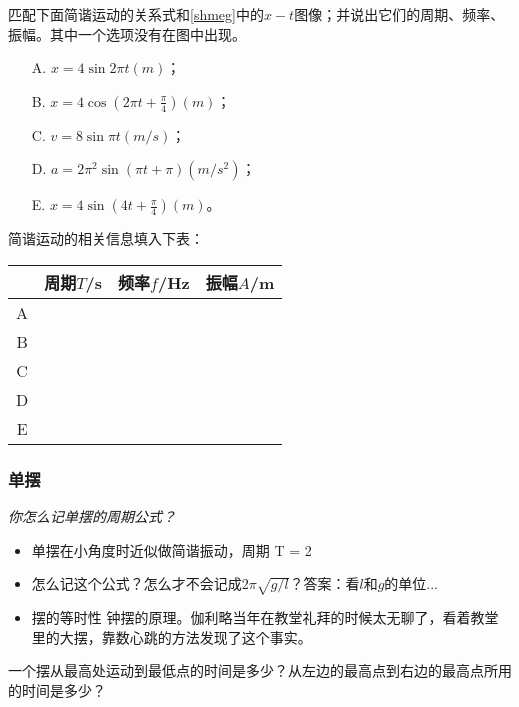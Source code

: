 \documentclass[a4paper,9pt]{ctexart}
\begin{document}
\begin{eg}
匹配下面简谐运动的关系式和\cref{shmeg}中的$x-t$图像；并说出它们的周期、频率、振幅。其中一个选项没有在图中出现。
\begin{enumerate}
\item[A.] $x = 4\sin 2\pi t \unit{(m)}$；
\item[B.] $x = 4\cos (2\pi t + \frac{\pi}{4}) \unit{(m)}$；
\item[C.] $v = 8\sin \pi t \unit{(m/s)}$；
\item[D.] $a = 2\pi^2 \sin (\pi t + \pi) \unit{(m/s^2)}$；
\item[E.] $x = 4\sin(4t + \frac{\pi}{4}) \unit{(m)}$。
\end{enumerate}
\end{eg}
\begin{ans}
简谐运动的相关信息填入下表：
\begin{center}
\begin{tabular}{c|p{20mm}|p{20mm}|p{20mm}}
 & 周期$T$/s & 频率$f$/Hz & 振幅$A$/m \\ \hline
 A & & & \\ \hline
 B & & & \\ \hline
 C & & & \\ \hline
 D & & & \\ \hline
 E & & & 
 \end{tabular}
 \end{center}
 \end{ans}

\subsubsection{单摆}
\emph{你怎么记单摆的周期公式？}
\begin{itemize}
\item
单摆在小角度时近似做简谐振动，周期
\beq
T = 2\pi {}
\eeq
\item
怎么记这个公式？怎么才不会记成$2\pi \sqrt{g/l}$？答案：看$l$和$g$的单位...
\item
摆的等时性 \so 钟摆的原理。伽利略当年在教堂礼拜的时候太无聊了，看着教堂里的大摆，靠数心跳的方法发现了这个事实。
\end{itemize}
\begin{eg}
一个摆从最高处运动到最低点的时间是多少？从左边的最高点到右边的最高点所用的时间是多少？
\end{eg}
\begin{ans}
\ \\
\ \\
\end{ans}
\end{document}
